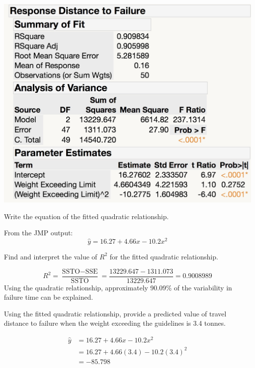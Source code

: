 \documentclass{examsetup}\usepackage[]{graphicx}\usepackage[]{color}
\begin{document}
\begin{questions}
\begin{parts}
   \centerline{\includegraphics[scale=.2]{FitModel}}

   \begin{subparts}
      \subpart[5] Write the equation of the fitted quadratic relationship. 
      \begin{solution}
         From the JMP output: \\

         $$\hat{y} = 16.27 + 4.66 x - 10.2 x^2$$
      \end{solution} 
      \subpart[5] Find and interpret the value of $R^2$ for the fitted quadratic relationship.
      \begin{solution}
         $$
         R^2 = \frac{\text{SSTO} - \text{SSE}}{\text{SSTO}} = \frac{13229.647 - 1311.073}{13229.647} = 0.9008989
         $$
         Using the quadratic relationship, approximately 90.09\% of the variability in failure time can be explained.
      \end{solution}
      \subpart[5] Using the fitted quadratic relationship, provide a predicted value of travel distance to failure when the weight exceeding the guidelines is 3.4 tonnes.
      \begin{solution}
         \begin{align*}
         \hat{y} &= 16.27 + 4.66 x - 10.2 x^2 \\
                 &= 16.27 + 4.66 (3.4) - 10.2 (3.4)^2 \\
                 &= \ensuremath{-85.798} \\
         \end{align*}
      \end{solution}
   \end{subparts}
\end{parts}

\end{questions}
\end{document}
